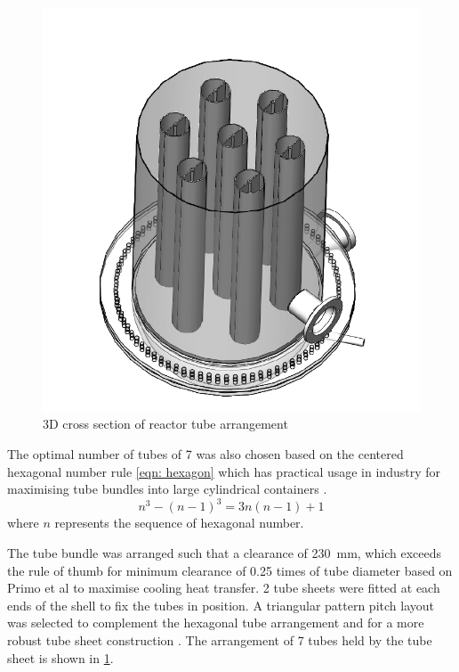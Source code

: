 \begin{figure}
    \centering
    \includegraphics[width=\linewidth]{chapters/2-reaction/figures/FYD reactor 7 tubes cross section 3D.PNG}
    \caption{3D cross section of reactor tube arrangement}
    \label{fig:reactortubearrangement}
\end{figure}
The optimal number of tubes of 7 was also chosen based on the centered hexagonal number rule \cref{eqn: hexagon} which has practical usage in industry for maximising tube bundles into large cylindrical containers \cite{noauthor_realiable_2018}. 
\begin{equation}
    n^3 - (n-1)^3 = 3n(n-1)+1
    \label{eqn: hexagon}
\end{equation}
where $n$ represents the sequence of hexagonal number. 

The tube bundle was arranged such that a clearance of \SI{230}{\milli \metre}, which exceeds the rule of thumb for minimum clearance of 0.25 times of tube diameter based on Primo et al \cite{primo_shell_2012} to maximise cooling heat transfer. 2 tube sheets were fitted at each ends of the shell to fix the tubes in position. A triangular pattern pitch layout was selected to complement the hexagonal tube arrangement and for a more robust tube sheet construction \cite{primo_shell_2012}.  The arrangement of 7 tubes held by the tube sheet is shown in \cref{fig:reactortubearrangement}.



